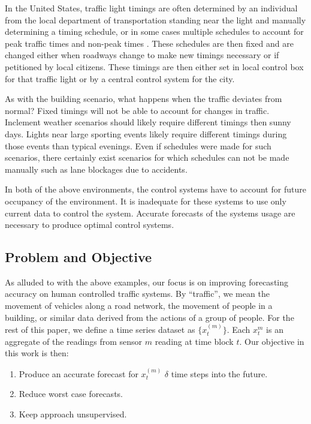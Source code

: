 In the United States, traffic light timings are often determined by an individual from the local department of transportation standing near the light and manually determining a timing schedule, or in some cases multiple schedules to account for peak traffic times and non-peak times \cite{Koonce2008}.  These schedules are then fixed and are changed either when roadways change to make new timings necessary or if petitioned by local citizens.  These timings are then either set in local control box for that traffic light or by a central control system for the city.  

As with the building scenario, what happens when the traffic deviates from normal?  Fixed timings will not be able to account for changes in traffic.  Inclement weather scenarios should likely require different timings then sunny days.  Lights near large sporting events likely require different timings during those events than typical evenings.  Even if schedules were made for such scenarios, there certainly exist scenarios for which schedules can not be made manually such as lane blockages due to accidents. 

In both of the above environments, the control systems have to account for future occupancy of the environment.  It is inadequate for these systems to use only current data to control the system.  Accurate forecasts of the systems usage are necessary to produce optimal control systems.  

\subsection{Problem and Objective}
As alluded to with the above examples, our focus is on improving forecasting accuracy on human controlled traffic systems.  By “traffic”, we mean the movement of vehicles along a road network, the movement of people in a building, or similar data derived from the actions of a group of people.  For the rest of this paper, we define a time series dataset as $\{x_{t}^{(m)}\}$.  Each $x_{t}^{m}$ is an aggregate of the readings from sensor $m$ reading at time block $t$.  Our objective in this work is then:

\begin{enumerate}
	\item Produce an accurate forecast for $x_{t}^{(m)}$ $\delta$ time steps into the future.
	\item Reduce worst case forecasts.
	\item Keep approach unsupervised.
\end{enumerate}

